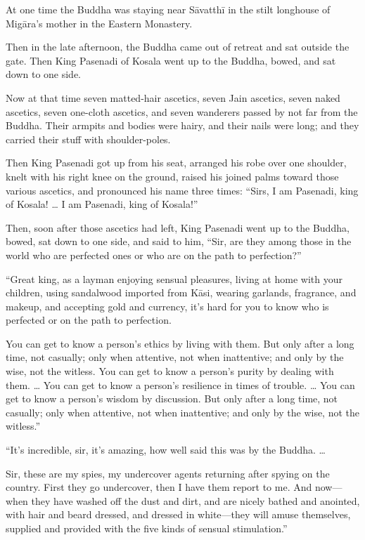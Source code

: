 \documentclass[12pt,openany]{book}%
\begin{document}
At one time the Buddha was staying near \textsanskrit{Sāvatthī} in the stilt longhouse of \textsanskrit{Migāra}’s mother in the Eastern Monastery. 

Then in the late afternoon, the Buddha came out of retreat and sat outside the gate. Then King Pasenadi of Kosala went up to the Buddha, bowed, and sat down to one side. 

Now at that time seven matted-hair ascetics, seven Jain ascetics, seven naked ascetics, seven one-cloth ascetics, and seven wanderers passed by not far from the Buddha. Their armpits and bodies were hairy, and their nails were long; and they carried their stuff with shoulder-poles. 

Then King Pasenadi got up from his seat, arranged his robe over one shoulder, knelt with his right knee on the ground, raised his joined palms toward those various ascetics, and pronounced his name three times: “Sirs, I am Pasenadi, king of Kosala! … I am Pasenadi, king of Kosala!” 

Then, soon after those ascetics had left, King Pasenadi went up to the Buddha, bowed, sat down to one side, and said to him, “Sir, are they among those in the world who are perfected ones or who are on the path to perfection?” 

“Great king, as a layman enjoying sensual pleasures, living at home with your children, using sandalwood imported from \textsanskrit{Kāsi}, wearing garlands, fragrance, and makeup, and accepting gold and currency, it’s hard for you to know who is perfected or on the path to perfection. 

You can get to know a person’s ethics by living with them. But only after a long time, not casually; only when attentive, not when inattentive; and only by the wise, not the witless. You can get to know a person’s purity by dealing with them. … You can get to know a person’s resilience in times of trouble. … You can get to know a person’s wisdom by discussion. But only after a long time, not casually; only when attentive, not when inattentive; and only by the wise, not the witless.” 

“It’s incredible, sir, it’s amazing, how well said this was by the Buddha. … 

Sir, these are my spies, my undercover agents returning after spying on the country. First they go undercover, then I have them report to me. And now—when they have washed off the dust and dirt, and are nicely bathed and anointed, with hair and beard dressed, and dressed in white—they will amuse themselves, supplied and provided with the five kinds of sensual stimulation.” 
\end{document}
